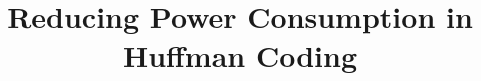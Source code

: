 \documentclass[preprint,12pt]{elsarticle}
\begin{document}
\begin{frontmatter}



\title{Reducing Power Consumption in Huffman Coding}


\author{}

\address{}

\begin{abstract}

\end{abstract}

\begin{keyword}



\end{keyword}

\end{frontmatter}


\end{document}
